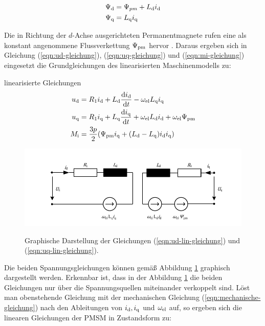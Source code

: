 \begin{align}
	\Psi_{\mathrm{d}} &= \Psi_{pm} + L_{\mathrm{d}}i_{\mathrm{d}} \\
	\Psi_{\mathrm{q}} &= L_{\mathrm{q}}i_{\mathrm{q}}
\end{align}

Die in Richtung der $d$-Achse ausgerichteten Permanentmagnete rufen eine als konstant angenommene Flussverkettung $\Psi_{\mathrm{pm}}$ hervor \autocite{kellner2012}.
Daraus ergeben sich in Gleichung (\ref{eqn:ud-gleichung}), (\ref{eqn:uq-gleichung}) und (\ref{eqn:mi-gleichung}) eingesetzt die Grundgleichungen des linearisierten Maschinenmodells zu:

\begin{shaded}
linearisierte Gleichungen
\begin{align}
		u_{\mathrm{d}} &= R_{\mathrm{1}}i_{\mathrm{d}} + L_{\mathrm{d}}\frac{\mathrm{d}i_{\mathrm{d}}}{\mathrm{d}t}-\omega_{\mathrm{el}}L_{\mathrm{q}}i_{\mathrm{q}} \label{eqn:ud-lin-gleichung} \\
		u_{\mathrm{q}} &= R_{\mathrm{1}}i_{\mathrm{q}} + L_{\mathrm{q}}\frac{\mathrm{d}i_{\mathrm{q}}}{\mathrm{d}t}+\omega_{\mathrm{el}}L_{\mathrm{d}}i_{\mathrm{d}} + \omega_{\mathrm{el}}\Psi_{\mathrm{pm}}  \label{eqn:uq-lin-gleichung} \\
		M_{\mathrm{i}} &= \frac{3p}{2} ( \Psi_{\mathrm{pm}}i_{\mathrm{q}} + (L_{\mathrm{d}}-L_{\mathrm{q}})i_{\mathrm{d}}i_{\mathrm{q}}) \label{eqn:mi-lin-gleichung}
\end{align}
\end{shaded}

\begin{figure}[h!]
	\centering
	\includegraphics{_Bilder/ESB-synchron-dq.pdf}
	\label{fig:ESB-synchron-dq}
	\caption{Graphische Darstellung der Gleichungen (\ref{eqn:ud-lin-gleichung}) und (\ref{eqn:uq-lin-gleichung}).}
\end{figure}

Die beiden Spannungsgleichungen können gemäß Abbildung \ref{fig:ESB-synchron-dq} graphisch dargestellt werden.
Erkennbar ist, dass in der Abbildung \ref{fig:ESB-synchron-dq} die beiden Gleichungen nur über die Spannungsquellen miteinander verkoppelt sind.
Löst man obenstehende Gleichung mit der mechanischen Gleichung (\ref{eqn:mechanische-gleichung}) nach den Ableitungen von $i_{\mathrm{d}}, i_{\mathrm{q}}$ und $\omega_{\mathrm{el}}$ auf, so ergeben sich die linearen Gleichungen der PMSM in Zustandsform zu:

